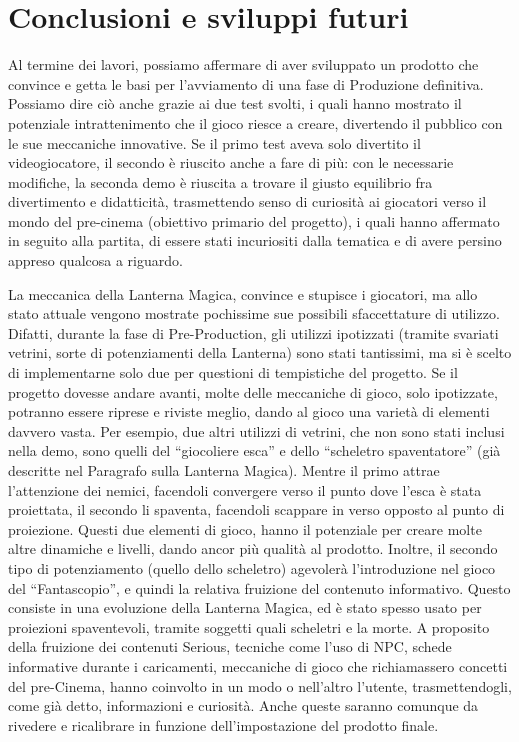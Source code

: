 \chapter{Conclusioni e sviluppi futuri}
\label{chap:risultati}

Al termine dei lavori, possiamo affermare di aver sviluppato un prodotto che convince e getta le basi per l'avviamento di una fase di Produzione definitiva. Possiamo dire ciò anche grazie ai due test svolti, i quali hanno mostrato il potenziale intrattenimento che il gioco riesce a creare, divertendo il pubblico con le sue meccaniche innovative. Se il primo test aveva solo divertito il videogiocatore, il secondo è riuscito anche a fare di più: con le necessarie modifiche, la seconda demo è riuscita a trovare il giusto equilibrio fra divertimento e didatticità, trasmettendo senso di curiosità ai giocatori verso il mondo del pre-cinema (obiettivo primario del progetto), i quali hanno affermato in seguito alla partita, di essere stati incuriositi dalla tematica e di avere persino appreso qualcosa a riguardo.

La meccanica della Lanterna Magica, convince e stupisce i giocatori, ma allo stato attuale vengono mostrate pochissime sue possibili sfaccettature di utilizzo. Difatti, durante la fase di Pre-Production, gli utilizzi ipotizzati (tramite svariati vetrini, sorte di potenziamenti della Lanterna) sono stati tantissimi, ma si è scelto di implementarne solo due per questioni di tempistiche del progetto. Se il progetto dovesse andare avanti, molte delle meccaniche di gioco, solo ipotizzate, potranno essere riprese e riviste meglio, dando al gioco una varietà di elementi davvero vasta. Per esempio, due altri utilizzi di vetrini, che non sono stati inclusi nella demo, sono quelli del ``giocoliere esca'' e dello ``scheletro spaventatore'' (già descritte nel Paragrafo  sulla Lanterna Magica). Mentre il primo attrae l'attenzione dei nemici, facendoli convergere verso il punto dove l'esca è stata proiettata, il secondo li spaventa, facendoli scappare in verso opposto al punto di proiezione. Questi due elementi di gioco, hanno il potenziale per creare molte altre dinamiche e livelli, dando ancor più qualità al prodotto. Inoltre, il secondo tipo di potenziamento (quello dello scheletro) agevolerà l'introduzione nel gioco del ``Fantascopio'', e quindi la relativa fruizione del contenuto informativo. Questo consiste in una evoluzione della Lanterna Magica, ed è stato spesso usato per proiezioni spaventevoli, tramite soggetti quali scheletri e la morte.
A proposito della fruizione dei contenuti Serious, tecniche come l'uso di NPC, schede informative durante i caricamenti, meccaniche di gioco che richiamassero concetti del pre-Cinema, hanno coinvolto in un modo o nell'altro l'utente, trasmettendogli, come già detto, informazioni e curiosità. Anche queste saranno comunque da rivedere e ricalibrare in funzione dell'impostazione del prodotto finale.


